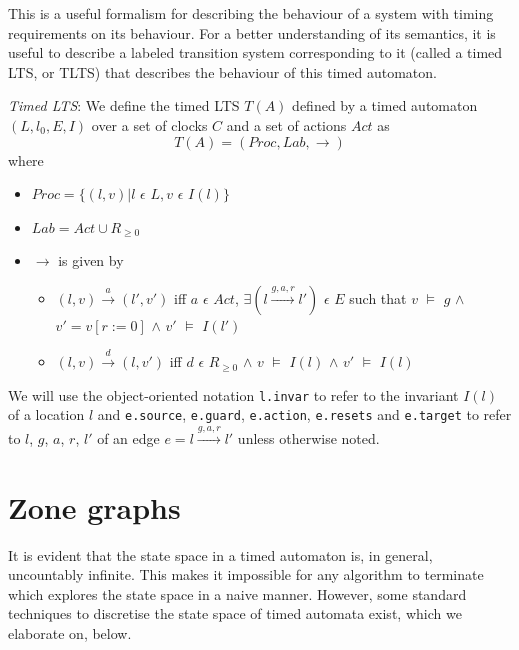 \documentclass[a4paper]{llncs}
\begin{document}
This is a useful formalism for describing the behaviour of a system
with timing requirements on its behaviour. For a better understanding
of its semantics, it is useful to describe a labeled transition system
corresponding to it (called a timed LTS, or TLTS) that describes the
behaviour of this timed automaton.

\begin{definition}
  \emph{Timed LTS}: We define the timed LTS $T(A)$ defined by a timed
  automaton $(L, l_{0}, E, I)$ over a set of clocks $C$ and a set of
  actions $Act$ as 
  \begin{displaymath}
    T(A) = (Proc, Lab, \rightarrow)
  \end{displaymath}
  where
  \begin{itemize}
  \item $Proc = \{(l, v) | l$ $\epsilon$ $L, v$ $\epsilon$ $I(l)\}$
  \item $Lab = Act \cup R_{\ge 0}$
  \item $\rightarrow$ is given by
    \begin{itemize}
    \item $(l, v) \xrightarrow{a} (l', v')$ iff $a$ $\epsilon$ $Act$, $\exists (l
      \xrightarrow{g, a, r} l')$ $\epsilon$ $E$ such that $v$ $\models$
      $g$ $\wedge$ $v'=v[r:=0]$ $\wedge$ $v'$ $\models$ $I(l')$
    \item $(l, v) \xrightarrow{d} (l, v')$ iff $d$ $\epsilon$ $R_{\ge
      0}$ $\wedge$ $v$ $\models$ $I(l)$ $\wedge$ $v'$ $\models$ $I(l)$
    \end{itemize}
  \end{itemize}

\end{definition}

We will use the object-oriented notation \texttt{l.invar} to refer to
the invariant $I(l)$ of a location $l$ and \texttt{e.source}, \texttt{e.guard},
\texttt{e.action}, \texttt{e.resets} and \texttt{e.target} to refer to
$l$, $g$, $a$, $r$, $l'$ of
an edge $e = l \xrightarrow{g, a, r} l'$ unless otherwise noted.

\section{Zone graphs}

It is evident that the state space in a timed automaton is, in
general, uncountably infinite. This makes it impossible for any
algorithm to terminate which explores the state space in a naive
manner. However, some standard techniques to discretise the state
space of timed automata exist, which we elaborate on, below.
\end{document}
